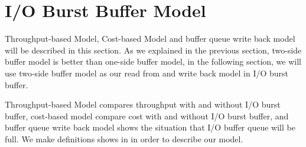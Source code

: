 \section{I/O Burst Buffer Model}


Throughput-based Model, Cost-based Model and buffer queue write back model will be described in this section.
As we explained in the previous section, two-side buffer model is better than one-side buffer model, in the following section, we will use two-side buffer model as our read from and write back model in I/O burst buffer.

Throughput-based Model compares throughput with and without I/O burst buffer, cost-based model compare cost with and without I/O burst buffer, and buffer queue write back model shows the situation that I/O buffer queue will be full. 
We make definitions shows in  in order to describe our model.
